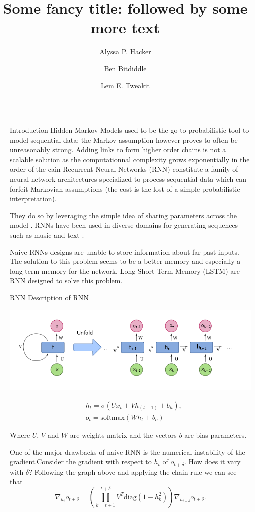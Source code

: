 \documentclass[final]{beamer}
\title{Some fancy title: followed by some more text}
\author{Alyssa P. Hacker \inst{1} \and Ben Bitdiddle \inst{2} \and Lem E. Tweakit \inst{2}}
\institute[shortinst]{\inst{1} Some Institute \samelineand \inst{2} Another Institute}
\newlength{\sepwidth}
\newlength{\colwidth}
\newcommand{\separatorcolumn}{\begin{column}{\sepwidth}\end{column}}
\begin{document}
\begin{frame}[t]
\begin{columns}[t]
\separatorcolumn

\begin{column}{\colwidth}

\begin{block}{Introduction}
Hidden Markov Models used to be the go-to probabilistic tool to model 
sequential data; the Markov assumption however proves to often be 
unreasonably strong. Adding links to form higher order chains
is not a scalable solution as the computationnal complexity grows 
exponentially in the order of the cain
Recurrent Neural Networks (RNN) constitute a family of neural network architectures
specialized to process sequential data which can forfeit Markovian assumptions
(the cost is the lost of a simple probabilistic interpretation).

They do so by leveraging the simple idea
of sharing parameters across the model \cite{deeplearning}.
RNNs have been used in diverse domains for
generating sequences such as music and text \cite{gravesGenerating}.

Naive RNNs designs are unable to store information about far past
inputs. The solution to this problem seems to be a better memory and especially
a long-term memory for the network.  Long Short-Term Memory (LSTM) are RNN
designed to solve this problem.
\end{block}

\begin{block}{RNN} 
  Description of RNN
\begin{center}
    \includegraphics[width = 0.9\linewidth]{RNN.png}
\end{center}
\begin{align*}
    &h_t = \sigma(U x_t + V h_{(t-1)} + b_h)\text{,}\\
    &o_t = \text{softmax}(W h_t + b_o)
\end{align*}

Where $ U$, $V$ and $W$ are weights matrix and the vectors $b$ are bias
parameters.

One of the major drawbacks of naive RNN is the numerical
instability of the gradient.Consider the gradient with respect to $h_t$ of $o_{t + \delta}$.
How does it vary with $\delta$? Following the graph above and applying the
chain rule we can see that
\begin{equation*}
  \nabla_{h_t} o_{t + \delta} = \left( \prod_{k = t+1}^{t+\delta} V^T
  \text{diag}(1 - h^2_k) \right)\nabla_{h_{t + \delta}}o_{t + \delta}.
\end{equation*}


\end{block}
\end{column}
\end{columns}
\end{frame}
\end{document}
